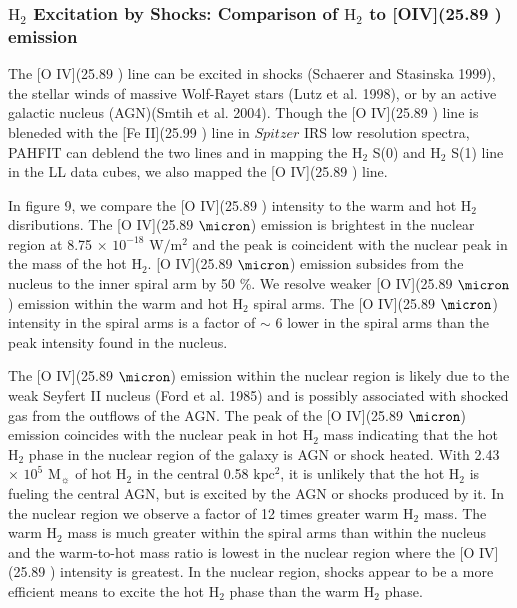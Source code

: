 \documentclass[manuscript]{aastex}
\begin{document}
\subsubsection{$\mathrm{H_2}$ Excitation by Shocks: Comparison of $\mathrm{H_2}$ to [OIV](25.89 \micron) emission}

The [O IV](25.89 \micron) line can be excited in shocks (Schaerer and Stasinska 1999), the stellar winds of massive Wolf-Rayet stars (Lutz et al. 1998), or by an active galactic nucleus (AGN)(Smtih et al. 2004).  Though the [O IV](25.89 \micron) line is bleneded with the [Fe II](25.99 \micron) line in $Spitzer$ IRS low resolution spectra, PAHFIT can deblend the two lines and in mapping the $\mathrm{H_2}$ S(0) and $\mathrm{H_2}$ S(1) line in the LL data cubes, we also mapped the [O IV](25.89 \micron) line.

In figure 9, we compare the [O IV](25.89 \micron) intensity to the warm and hot $\mathrm{H_2}$ disributions.  
The [O IV](25.89 $\micron$) emission is brightest in the nuclear region at 8.75 $\times$ $\mathrm{10^{-18}}$ $\mathrm{W/m^2}$ and the peak is coincident with the nuclear peak in the mass of the hot $\mathrm{H_2}$.  [O IV](25.89 $\micron$) emission subsides from the nucleus to the inner spiral arm by 50 \%.  We resolve weaker [O IV](25.89 $\micron$) emission within the warm and hot $\mathrm{H_2}$ spiral arms.  The  [O IV](25.89 $\micron$) intensity in the spiral arms is a factor of $\sim$ 6 lower in the spiral arms than the peak intensity found in the nucleus.

The [O IV](25.89 $\micron$) emission within the nuclear region is likely due to the weak Seyfert II nucleus (Ford et al. 1985) and is possibly associated with shocked gas from the outflows of the AGN.  The peak of the [O IV](25.89 $\micron$) emission coincides with the nuclear peak in hot $\mathrm{H_2}$ mass indicating that the hot $\mathrm{H_2}$ phase in the nuclear region of the galaxy is AGN or shock heated.  With 2.43 $\times$ $\mathrm{10^5}$ $\mathrm{M_\sun}$ of hot $\mathrm{H_2}$ in the central 0.58 $\mathrm{kpc^2}$, it is unlikely that the hot $\mathrm{H_2}$ is fueling the central AGN, but is excited by the AGN or shocks produced by it.  In the nuclear region we observe a factor of 12 times greater warm $\mathrm{H_2}$ mass.  The warm $\mathrm{H_2}$ mass is much greater within the spiral arms than within the nucleus and the warm-to-hot mass ratio is lowest in the nuclear region where the  [O IV](25.89 \micron) intensity is greatest.  In the nuclear region, shocks appear to be a more efficient means to excite the hot $\mathrm{H_2}$ phase than the warm $\mathrm{H_2}$ phase.
\end{document}
